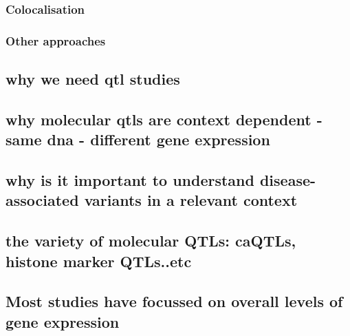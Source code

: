 \subsubsection{Colocalisation}

\subsubsection{Other approaches}




\subsection{why we need qtl studies}
\subsection{why molecular qtls are context dependent - same dna - different gene expression}
\subsection{why is it important to understand disease-associated variants in a relevant context}
\subsection{the variety of molecular QTLs: caQTLs, histone marker QTLs..etc}
\subsection{Most studies have focussed on overall levels of gene expression}